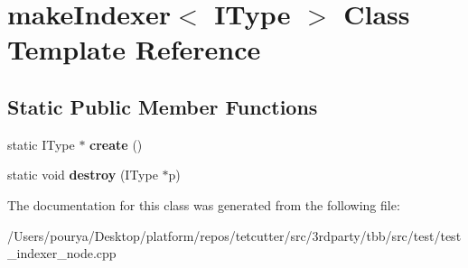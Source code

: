 \hypertarget{classmakeIndexer}{}\section{make\+Indexer$<$ I\+Type $>$ Class Template Reference}
\label{classmakeIndexer}
\subsection*{Static Public Member Functions}
\begin{DoxyCompactItemize}
\item 
\hypertarget{classmakeIndexer_acb239a0dfd677ba3817dab0c3fda1cea}{}static I\+Type $\ast$ {\bfseries create} ()\label{classmakeIndexer_acb239a0dfd677ba3817dab0c3fda1cea}

\item 
\hypertarget{classmakeIndexer_a95050cf177659cc3303273ecfcbccf9b}{}static void {\bfseries destroy} (I\+Type $\ast$p)\label{classmakeIndexer_a95050cf177659cc3303273ecfcbccf9b}

\end{DoxyCompactItemize}


The documentation for this class was generated from the following file\+:\begin{DoxyCompactItemize}
\item 
/\+Users/pourya/\+Desktop/platform/repos/tetcutter/src/3rdparty/tbb/src/test/test\+\_\+indexer\+\_\+node.\+cpp\end{DoxyCompactItemize}

